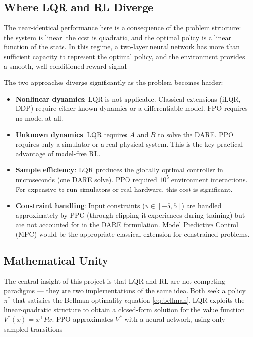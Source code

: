 \documentclass[11pt, a4paper]{article}
\newcommand{\T}{^\top}
\begin{document}
\subsection{Where LQR and RL Diverge}

The near-identical performance here is a consequence of the problem
structure: the system is linear, the cost is quadratic, and the optimal
policy is a linear function of the state. In this regime, a two-layer
neural network has more than sufficient capacity to represent the optimal
policy, and the environment provides a smooth, well-conditioned reward
signal.

The two approaches diverge significantly as the problem becomes harder:

\begin{itemize}[leftmargin=2em]
  \item \textbf{Nonlinear dynamics}: LQR is not applicable. Classical
        extensions (iLQR, DDP) require either known dynamics or a
        differentiable model. PPO requires no model at all.

  \item \textbf{Unknown dynamics}: LQR requires $A$ and $B$ to solve the
        DARE. PPO requires only a simulator or a real physical system.
        This is the key practical advantage of model-free RL.

  \item \textbf{Sample efficiency}: LQR produces the globally optimal
        controller in microseconds (one DARE solve). PPO required
        $10^5$ environment interactions. For expensive-to-run simulators
        or real hardware, this cost is significant.

  \item \textbf{Constraint handling}: Input constraints ($u \in [-5,5]$)
        are handled approximately by PPO (through clipping it experiences
        during training) but are not accounted for in the DARE formulation.
        Model Predictive Control (MPC) would be the appropriate classical
        extension for constrained problems.
\end{itemize}

\subsection{Mathematical Unity}

The central insight of this project is that LQR and RL are not competing
paradigms — they are two implementations of the same idea. Both seek a
policy $\pi^*$ that satisfies the Bellman optimality equation
\eqref{eq:bellman}. LQR exploits the linear-quadratic structure to obtain
a closed-form solution for the value function $V^*(x) = x\T Px$. PPO
approximates $V^*$ with a neural network, using only sampled transitions.
\end{document}

